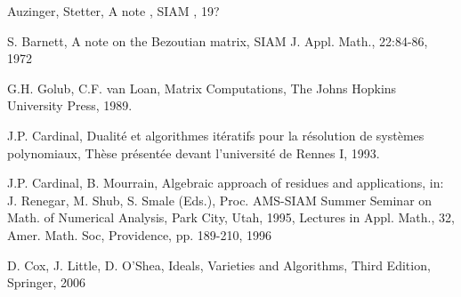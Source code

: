 \documentclass{standalone}
\begin{document}
  \begin{thebibliography}{00}

  {Auzinger, Stetter}, {A note }, {SIAM }, {19?}

  {S. Barnett}, {A note on the Bezoutian matrix}, {SIAM J. Appl. Math., 22:84-86}, {1972}

  {G.H. Golub, C.F. van Loan}, {Matrix Computations}, {The Johns Hopkins University Press}, {1989}.

  {J.P. Cardinal}, {Dualité et algorithmes itératifs pour la résolution de systèmes polynomiaux}, {Thèse présentée devant l'université de Rennes I}, {1993}.

  {J.P. Cardinal, B. Mourrain}, {Algebraic approach of residues and applications}, {in: J. Renegar, M. Shub, S. Smale (Eds.), Proc. AMS-SIAM Summer Seminar on Math. of Numerical Analysis, Park City, Utah, 1995, Lectures in Appl. Math., 32, Amer. Math. Soc, Providence, pp. 189-210}, {1996}

  {D. Cox, J. Little, D. O'Shea}, {Ideals, Varieties and Algorithms}, {Third Edition}, {Springer}, {2006}
  \end{thebibliography}
\end{document}
